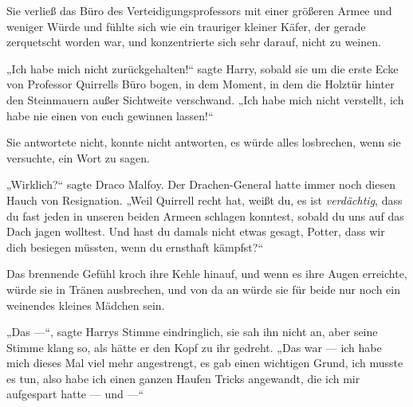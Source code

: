\later

Sie verließ das Büro des Verteidigungsprofessors mit einer größeren Armee und weniger Würde und fühlte sich wie ein trauriger kleiner Käfer, der gerade zerquetscht worden war, und konzentrierte sich sehr darauf, nicht zu weinen.

„Ich habe mich nicht zurückgehalten!“ sagte Harry, sobald sie um die erste Ecke von Professor Quirrells Büro bogen, in dem Moment, in dem die Holztür hinter den Steinmauern außer Sichtweite verschwand.
„Ich habe mich nicht verstellt, ich habe nie einen von euch gewinnen lassen!“

Sie antwortete nicht, konnte nicht antworten, es würde alles losbrechen, wenn sie versuchte, ein Wort zu sagen.

„Wirklich?“ sagte Draco Malfoy. Der Drachen-General hatte immer noch diesen Hauch von Resignation.
„Weil Quirrell recht hat, weißt du, es ist \emph{verdächtig}, dass du fast jeden in unseren beiden Armeen schlagen konntest, sobald du uns auf das Dach jagen wolltest. Und hast du damals nicht etwas gesagt, Potter, dass wir dich besiegen müssten, wenn du ernsthaft kämpfst?“

Das brennende Gefühl kroch ihre Kehle hinauf, und wenn es ihre Augen erreichte, würde sie in Tränen ausbrechen, und von da an würde sie für beide nur noch ein weinendes kleines Mädchen sein.

„Das —“, sagte Harrys Stimme eindringlich, sie sah ihn nicht an, aber seine Stimme klang so, als hätte er den Kopf zu ihr gedreht.
„Das war — ich habe mich dieses Mal viel mehr angestrengt, es gab einen wichtigen Grund, ich musste es tun, also habe ich einen ganzen Haufen Tricks angewandt, die ich mir aufgespart hatte — und —“

